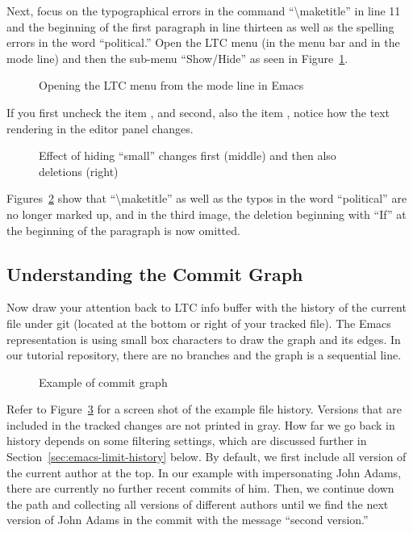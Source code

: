 Next, focus on the typographical errors in the command ``\textbackslash maketitle'' in line 11 and the beginning of the first paragraph in line thirteen as well as the spelling errors in the word ``political.''  Open the LTC menu (in the menu bar and in the mode line) and then the sub-menu ``Show/Hide'' as seen in Figure~\ref{fig:emacs-LTC-menu}.  
\begin{figure}[t]
\centering
{}
\caption{Opening the LTC menu from the mode line in Emacs} \label{fig:emacs-LTC-menu}
\end{figure}
If you first uncheck the item , and second, also the item , notice how the text rendering in the editor panel changes.
\begin{figure}[t]
  \centering
  \hspace{2em}
  \hspace{2em}
\caption{Effect of hiding ``small'' changes first (middle) and then also deletions (right)} \label{fig:emacs-filter-small}
\end{figure}
Figures~\ref{fig:emacs-filter-small} show that ``\textbackslash maketitle'' as well as the typos in the word ``political'' are no longer marked up, and in the third image, the deletion beginning with ``If'' at the beginning of the paragraph is now omitted.

\subsection{Understanding the Commit Graph}

Now draw your attention back to LTC info buffer with the history of the current file under git (located at the bottom or right of your tracked file).  The Emacs representation is using small box characters to draw the graph and its edges.  In our tutorial repository, there are no branches and the graph is a sequential line.  
\begin{figure}[t]
\centering
{}
\caption{Example of commit graph} \label{fig:emacs-commit-graph}
\end{figure}
Refer to Figure~\ref{fig:emacs-commit-graph} for a screen shot of the example file history. Versions that are included in the tracked changes are not printed in gray.  How far we go back in history depends on some filtering settings, which are discussed further in Section~\ref{sec:emacs-limit-history} below.  By default, we first include all version of the current author at the top.  In our example with impersonating John Adams, there are currently no further recent commits of him.  Then, we continue down the path and collecting all versions of different authors until we find the next version of John Adams in the commit with the message ``second version.''

